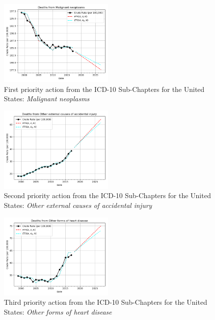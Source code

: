 \documentclass[10pt, a4paper, twocolumn]{IEEEconf}
\begin{document}
\begin{figure}[H]
  \centering
  \includegraphics[width=0.5\textwidth]{results/US_ICD10_SUB_CHAPTERS/Malignant_neoplasms_ets.png}
  \caption{First priority action from the ICD-10 Sub-Chapters for the United States: \textit{Malignant neoplasms}}\label{fig:k6a}
\end{figure}
  
\begin{figure}[H]
  \centering
  \includegraphics[width=0.5\textwidth]{results/US_ICD10_SUB_CHAPTERS/Other_external_causes_of_accidental_injury_ets.png}
  \caption{Second priority action from the ICD-10 Sub-Chapters for the United States: \textit{Other external causes of accidental injury}}\label{fig:k6b}
\end{figure}
  
\begin{figure}[H]
  \centering
  \includegraphics[width=0.5\textwidth]{results/US_ICD10_SUB_CHAPTERS/Other_forms_of_heart_disease_ets.png}
  \caption{Third priority action from the ICD-10 Sub-Chapters for the United States: \textit{Other forms of heart disease}}\label{fig:k6c}
\end{figure}
  
\end{document}
